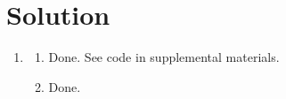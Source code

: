 \documentclass[submit]{../harvardml}
\newenvironment{solution}
  {\color{blue}\section*{Solution}}
{}
\begin{document}
\begin{solution}
\begin{enumerate}
\begin{enumerate}
\begin{figure}[htbp]
{              }
            \end{figure}
        \end{enumerate}
        
        \item
        \begin{enumerate}
            \item Done. See code in supplemental materials.
            \newpage
            \item Done. 
            \begin{figure}[htbp]
              \centering
              \hfill
              \\
\end{figure}
\end{enumerate}
\end{enumerate}
\end{solution}
\end{document}
